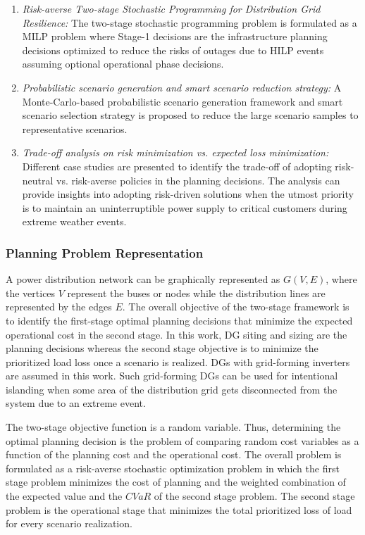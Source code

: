 
\begin{enumerate}
    \item \textit{Risk-averse Two-stage Stochastic Programming for Distribution Grid Resilience:} The two-stage stochastic programming problem is formulated as a MILP problem where Stage-1 decisions are the infrastructure planning decisions optimized to reduce the risks of outages due to HILP events assuming optional operational phase decisions.
    \item \textit{Probabilistic scenario generation and smart scenario reduction strategy:} A Monte-Carlo-based probabilistic scenario generation framework and smart scenario selection strategy is proposed to reduce the large scenario samples to representative scenarios.
    \item \textit{Trade-off analysis on risk minimization vs. expected loss minimization:} Different case studies are presented to identify the trade-off of adopting risk-neutral vs. risk-averse policies in the planning decisions. The analysis can provide insights into adopting risk-driven solutions when the utmost priority is to maintain an uninterruptible power supply to critical customers during extreme weather events.
\end{enumerate}

\subsubsection{Planning Problem Representation}

A power distribution network can be graphically represented as $G(V,E)$, where the vertices $V$ represent the buses or nodes while the distribution lines are represented by the edges $E$. The overall objective of the two-stage framework is to identify the first-stage optimal planning decisions that minimize the expected operational cost in the second stage. In this work, DG siting and sizing are the planning decisions whereas the second stage objective is to minimize the prioritized load loss once a scenario is realized. DGs with grid-forming inverters are assumed in this work. Such grid-forming DGs can be used for intentional islanding when some area of the distribution grid gets disconnected from the system due to an extreme event. 

The two-stage objective function is a random variable. Thus, determining the optimal planning decision is the problem of comparing random cost variables as a function of the planning cost and the operational cost. The overall problem is formulated as a risk-averse stochastic optimization problem in which the first stage problem minimizes the cost of planning and the weighted combination of the expected value and the $CVaR$ of the second stage problem. The second stage problem is the operational stage that minimizes the total prioritized loss of load for every scenario realization.
    
